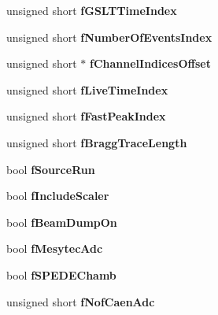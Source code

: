 \begin{DoxyCompactItemize}
unsigned short {\bfseries f\+G\+S\+L\+T\+Time\+Index}
\item 
\mbox{\label{class_global_settings_a0a695f74fb8fb13a7212c03cc1c90d45}} 
unsigned short {\bfseries f\+Number\+Of\+Events\+Index}
\item 
\mbox{\label{class_global_settings_a7b7fde75713d340b0c08b69cf52629b5}} 
unsigned short $\ast$ {\bfseries f\+Channel\+Indices\+Offset}
\item 
\mbox{\label{class_global_settings_af6b5925fc6dc199bd0859a1d4471f4fb}} 
unsigned short {\bfseries f\+Live\+Time\+Index}
\item 
\mbox{\label{class_global_settings_a909c95bed26cb1703234e1d7bbee812e}} 
unsigned short {\bfseries f\+Fast\+Peak\+Index}
\item 
\mbox{\label{class_global_settings_ad6552c5816c5265d32f930c96cb05897}} 
unsigned short {\bfseries f\+Bragg\+Trace\+Length}
\item 
\mbox{\label{class_global_settings_ab91214dfb8843edede96c9a0a6b43af4}} 
bool {\bfseries f\+Source\+Run}
\item 
\mbox{\label{class_global_settings_a8f72ba223b743b631ef8a5d5326e2cc1}} 
bool {\bfseries f\+Include\+Scaler}
\item 
\mbox{\label{class_global_settings_a7f5ff89ab87ee8d3be0b0f61929a9a90}} 
bool {\bfseries f\+Beam\+Dump\+On}
\item 
\mbox{\label{class_global_settings_a07a745de62188ac45111e5a0a53ee2a5}} 
bool {\bfseries f\+Mesytec\+Adc}
\item 
\mbox{\label{class_global_settings_a24efecbf225ff6579002125d0717581d}} 
bool {\bfseries f\+S\+P\+E\+D\+E\+Chamb}
\item 
\mbox{\label{class_global_settings_a3a834ca5fe537c8ee1a6eaee52fedf24}} 
unsigned short {\bfseries f\+Nof\+Caen\+Adc}

\end{DoxyCompactItemize}
